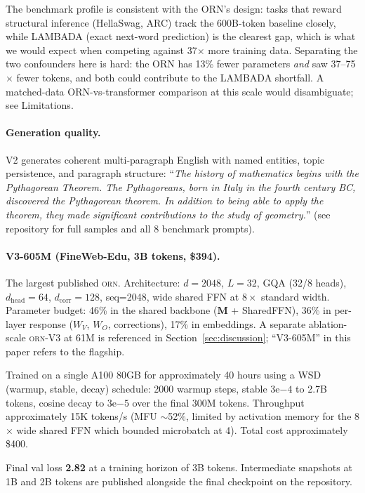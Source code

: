 \documentclass[10pt,twocolumn]{article}
\newcommand{\M}{\mathbf{M}}
\newcommand{\orn}{\textsc{orn}}
\begin{document}
The benchmark profile is consistent with the ORN's design: tasks that reward structural inference (HellaSwag, ARC) track the 600B-token baseline closely, while LAMBADA (exact next-word prediction) is the clearest gap, which is what we would expect when competing against 37$\times$ more training data. Separating the two confounders here is hard: the ORN has 13\% fewer parameters \emph{and} saw 37--75$\times$ fewer tokens, and both could contribute to the LAMBADA shortfall. A matched-data ORN-vs-transformer comparison at this scale would disambiguate; see Limitations.

\paragraph{Generation quality.}
V2 generates coherent multi-paragraph English with named entities, topic persistence, and paragraph structure: ``\textit{The history of mathematics begins with the Pythagorean Theorem. The Pythagoreans, born in Italy in the fourth century BC, discovered the Pythagorean theorem. In addition to being able to apply the theorem, they made significant contributions to the study of geometry.}'' (see repository for full samples and all 8 benchmark prompts).

\paragraph{V3-605M (FineWeb-Edu, 3B tokens, \$394).}
The largest published \orn{}. Architecture: $d{=}2048$, $L{=}32$, GQA (32/8 heads), $d_\text{head}{=}64$, $d_\text{corr}{=}128$, seq=2048, wide shared FFN at $8\times$ standard width. Parameter budget: 46\% in the shared backbone ($\M$ + SharedFFN), 36\% in per-layer response ($W_V$, $W_O$, corrections), 17\% in embeddings. A separate ablation-scale \orn{}-V3 at 61M is referenced in Section~\ref{sec:discussion}; ``V3-605M'' in this paper refers to the flagship.

Trained on a single A100 80GB for approximately 40 hours using a WSD (warmup, stable, decay) schedule: 2000 warmup steps, stable $3\mathrm{e}{-4}$ to 2.7B tokens, cosine decay to $3\mathrm{e}{-5}$ over the final 300M tokens. Throughput approximately 15K tokens/s (MFU $\sim$52\%, limited by activation memory for the 8$\times$ wide shared FFN which bounded microbatch at 4). Total cost approximately \$400.

Final val loss \textbf{2.82} at a training horizon of 3B tokens. Intermediate snapshots at 1B and 2B tokens are published alongside the final checkpoint on the repository.
\end{document}

